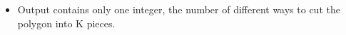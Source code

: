 \begin{itemize}
	\item Output contains only one integer, the number of different ways to cut the polygon into K pieces.
\end{itemize}